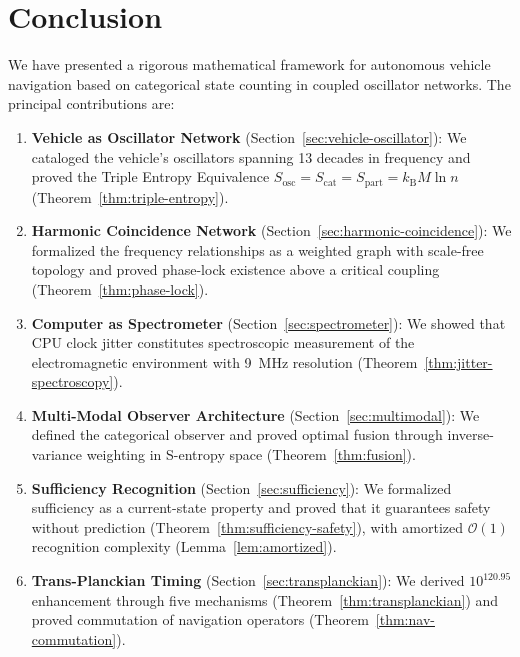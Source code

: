 \documentclass[twocolumn,10pt]{article}
\theoremstyle{definition}
\theoremstyle{remark}
\newcommand{\Sosc}{S_{\mathrm{osc}}}
\newcommand{\Scat}{S_{\mathrm{cat}}}
\newcommand{\Spart}{S_{\mathrm{part}}}
\newcommand{\kB}{k_{\mathrm{B}}}
\newcommand{\Ocal}{\mathcal{O}}
\begin{document}
\section{Conclusion}\label{sec:conclusion}

We have presented a rigorous mathematical framework for autonomous vehicle
navigation based on categorical state counting in coupled oscillator
networks. The principal contributions are:

\begin{enumerate}
  \item \textbf{Vehicle as Oscillator Network} (Section~\ref{sec:vehicle-oscillator}):
    We cataloged the vehicle's oscillators spanning 13 decades in frequency
    and proved the Triple Entropy Equivalence $\Sosc = \Scat = \Spart =
    \kB M \ln n$ (Theorem~\ref{thm:triple-entropy}).

  \item \textbf{Harmonic Coincidence Network}
    (Section~\ref{sec:harmonic-coincidence}): We formalized the frequency
    relationships as a weighted graph with scale-free topology and proved
    phase-lock existence above a critical coupling
    (Theorem~\ref{thm:phase-lock}).

  \item \textbf{Computer as Spectrometer}
    (Section~\ref{sec:spectrometer}): We showed that CPU clock jitter
    constitutes spectroscopic measurement of the electromagnetic
    environment with \SI{9}{MHz} resolution
    (Theorem~\ref{thm:jitter-spectroscopy}).

  \item \textbf{Multi-Modal Observer Architecture}
    (Section~\ref{sec:multimodal}): We defined the categorical observer
    and proved optimal fusion through inverse-variance weighting in
    S-entropy space (Theorem~\ref{thm:fusion}).

  \item \textbf{Sufficiency Recognition}
    (Section~\ref{sec:sufficiency}): We formalized sufficiency as a
    current-state property and proved that it guarantees safety without
    prediction (Theorem~\ref{thm:sufficiency-safety}), with amortized
    $\Ocal(1)$ recognition complexity (Lemma~\ref{lem:amortized}).

  \item \textbf{Trans-Planckian Timing}
    (Section~\ref{sec:transplanckian}): We derived $10^{120.95}$
    enhancement through five mechanisms
    (Theorem~\ref{thm:transplanckian}) and proved commutation of
    navigation operators (Theorem~\ref{thm:nav-commutation}).


\end{enumerate}
\end{document}
